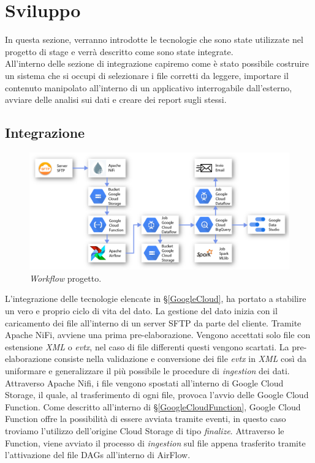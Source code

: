 \chapter{Sviluppo}\label{ch:sviluppo}
In questa sezione, verranno introdotte le tecnologie che sono state utilizzate nel progetto di stage e verrà descritto come sono state integrate. 
\\
All'interno delle sezione di integrazione capiremo come è stato possibile costruire un sistema che si occupi di selezionare i file corretti da leggere, importare il contenuto manipolato all'interno di un applicativo interrogabile dall'esterno, avviare delle analisi sui dati e creare dei report sugli stessi.
\section{Integrazione}
\begin{figure}[h!]
	\centering
	\includegraphics[scale=0.65]{figures/Schema_complessivo_ridotto}
	\caption[Workflow progetto	.]{\emph{Workflow} progetto.
		\label{fig:workflow}}
\end{figure}	
L'integrazione delle tecnologie elencate in §\ref{GoogleCloud}{}, ha portato a stabilire un vero e proprio ciclo di vita del dato.
La gestione del dato inizia con il caricamento dei file all'interno di un server SFTP da parte del cliente. Tramite Apache NiFi, avviene una prima pre-elaborazione. Vengono accettati solo file con estensione \emph{XML} o \emph{evtx}, nel caso di file differenti questi vengono scartati. La pre-elaborazione consiste nella validazione e conversione dei file \emph{evtx} in \emph{XML} così da uniformare e generalizzare il più possibile le procedure di \emph{ingestion} dei dati.
\\
Attraverso Apache Nifi, i file vengono spostati all'interno di Google Cloud Storage, il quale, al trasferimento di ogni file, provoca l'avvio delle Google Cloud Function. Come descritto all'interno di §\ref{GoogleCloudFunction}{}, Google Cloud Function offre la possibilità di essere avviata tramite eventi, in questo caso troviamo l'utilizzo dell'origine Cloud Storage di tipo \emph{finalize}. Attraverso le Function, viene avviato il processo di \emph{ingestion} sul file appena trasferito tramite l'attivazione del file DAGs all'interno di AirFlow.
